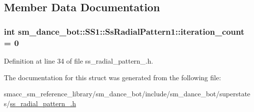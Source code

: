 \subsection{Member Data Documentation}
\subsubsection[{\texorpdfstring{iteration\+\_\+count}{iteration_count}}]{\setlength{\rightskip}{0pt plus 5cm}int sm\+\_\+dance\+\_\+bot\+::\+S\+S1\+::\+Ss\+Radial\+Pattern1\+::iteration\+\_\+count = 0}\hypertarget{structsm__dance__bot_1_1SS1_1_1SsRadialPattern1_a148a819e2406f494f14afae15e1497b5}{}\label{structsm__dance__bot_1_1SS1_1_1SsRadialPattern1_a148a819e2406f494f14afae15e1497b5}


Definition at line 34 of file ss\+\_\+radial\+\_\+pattern\+\_.\+h.



The documentation for this struct was generated from the following file\+:\begin{DoxyCompactItemize}
\item 
smacc\+\_\+sm\+\_\+reference\+\_\+library/sm\+\_\+dance\+\_\+bot/include/sm\+\_\+dance\+\_\+bot/superstates/\hyperlink{include_2sm__dance__bot_2superstates_2ss__radial__pattern__1_8h}{ss\+\_\+radial\+\_\+pattern\+\_.\+h}\end{DoxyCompactItemize}
